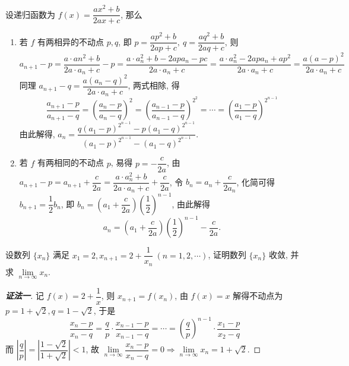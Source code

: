 \begin{solution}
    设递归函数为 $f(x)=\dfrac{ax^2+b}{2ax+c}$, 那么
    \begin{enumerate}
        \item 若 $f$ 有两相异的不动点 $p,q$, 即 $p=\dfrac{ap^2+b}{2ap+c},~q=\dfrac{aq^2+b}{2aq+c}$, 则
              $$a_{n+1}-p=\dfrac{a\cdot an^{2}+b}{2a\cdot a_{n}+c}-p=\dfrac{a\cdot a_{n}^{2}+b-2apa_{n}-pc}{2a\cdot a_{n}+c}=\dfrac{a\cdot a_{n}^{2}-2apa_{n}+ap^{2}}{2a\cdot a_{n}+c}=\dfrac{a(a-p)^2}{2a\cdot a_n+c}$$
              同理 $a_{n+1}-q=\dfrac{a\left( a_{n}-q\right) ^{2}}{2a\cdot a_{n}+c}$, 两式相除, 得
              $$\dfrac{a_{n+1}-p}{a_{n+1}-q}=\left(\dfrac{a_n-p}{a_n-q}\right)^2=\left(\dfrac{a_{n-1}-p}{a_{n-1}-q}\right)^{2^2}=\cdots=\left(\dfrac{a_1-p}{a_1-q}\right)^{2^{n-1}}$$
              由此解得, $a_{n}=\dfrac{q\left( a_{1}-p\right) ^{2^{n-1}}-p\left( a_1-q\right)^ {2^{n-1}}}{\left( a_{1}-p\right) ^{2^{n-1}}-\left( a_{1}-q\right) ^{2^{n-1}}}.$
        \item 若 $f$ 有两相同的不动点 $p$, 易得 $p=-\dfrac{c}{2a}$, 由 $a_{n+1}-p=a_{n+1}+\dfrac{c}{2a}=\dfrac{a\cdot a_n^2+b}{2a\cdot a_n+c}+\dfrac{c}{2a}$, 令 $b_n=a_n+\dfrac{c}{2a_n}$, 化简可得 $b_{n+1}=\dfrac{1}{2}b_n$, 
              即 $b_n=\left(a_1+\dfrac{c}{2a}\right)\left(\dfrac{1}{2}\right)^{n-1}$, 由此解得
              $$a_{n}=\left( a_{1}+\dfrac{c}{2a}\right) \left( \dfrac{1}{2}\right) ^{n-1}-\dfrac{c}{2a}.$$
    \end{enumerate}
\end{solution}
\begin{example}
    设数列 $\{x_n\}$ 满足 $x_1=2,x_{n+1}=2+\dfrac{1}{x_n}~  (n=1,2,\cdots)$, 证明数列 $\{x_n\}$ 收敛, 并求 $\lim\limits_{n\to\infty}x_n.$
\end{example}
\begin{proof}[{\songti \textbf{证法一}}]
    记 $f(x)=2+\dfrac{1}{x}$, 则 $x_{n+1}=f(x_n)$, 由 $f(x)=x$ 解得不动点为 $p=1+\sqrt{2},q=1-\sqrt{2}$, 于是
    $$\dfrac{x_{n}-p}{x_{n}-q}=\dfrac{q}{p}\cdot \dfrac{x_{n-1}-p}{x_{n-1}-q}=\cdots=\left( \dfrac{q}{p}\right) ^{n-1}\cdot \dfrac{x_{1}-p}{x_{2}-q}$$
    而 $\left| \dfrac{q}{p}\right| =\left| \dfrac{1-\sqrt{2}}{1+\sqrt{2}}\right|  <1$, 故 $\lim\limits_{n\to\infty}\dfrac{x_n-p}{x_n-q}=0\Rightarrow \lim\limits_{n\to\infty}x_n=1+\sqrt{2}.$
\end{proof}
